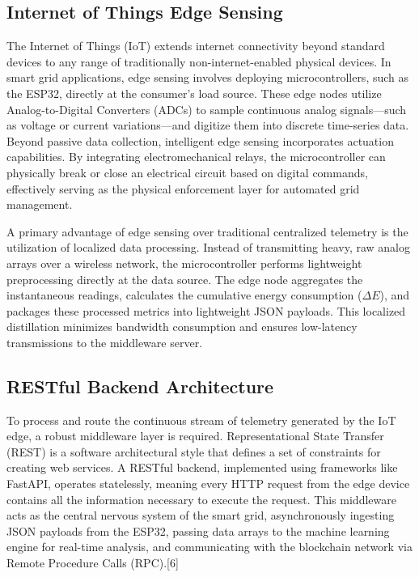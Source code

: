 \subsection{Internet of Things Edge Sensing}
The Internet of Things (IoT) extends internet connectivity beyond standard devices to any range of traditionally non-internet-enabled physical devices. In smart grid applications, edge sensing involves deploying microcontrollers, such as the ESP32, directly at the consumer's load source. These edge nodes utilize Analog-to-Digital Converters (ADCs) to sample continuous analog signals—such as voltage or current variations—and digitize them into discrete time-series data. Beyond passive data collection, intelligent edge sensing incorporates actuation capabilities. By integrating electromechanical relays, the microcontroller can physically break or close an electrical circuit based on digital commands, effectively serving as the physical enforcement layer for automated grid management.

A primary advantage of edge sensing over traditional centralized telemetry is the utilization of localized data processing. Instead of transmitting heavy, raw analog arrays over a wireless network, the microcontroller performs lightweight preprocessing directly at the data source. The edge node aggregates the instantaneous readings, calculates the cumulative energy consumption ($\Delta E$), and packages these processed metrics into lightweight JSON payloads. This localized distillation minimizes bandwidth consumption and ensures low-latency transmissions to the middleware server.

\subsection{RESTful Backend Architecture}
To process and route the continuous stream of telemetry generated by the IoT edge, a robust middleware layer is required. Representational State Transfer (REST) is a software architectural style that defines a set of constraints for creating web services. A RESTful backend, implemented using frameworks like FastAPI, operates statelessly, meaning every HTTP request from the edge device contains all the information necessary to execute the request. This middleware acts as the central nervous system of the smart grid, asynchronously ingesting JSON payloads from the ESP32, passing data arrays to the machine learning engine for real-time analysis, and communicating with the blockchain network via Remote Procedure Calls (RPC).[6]

